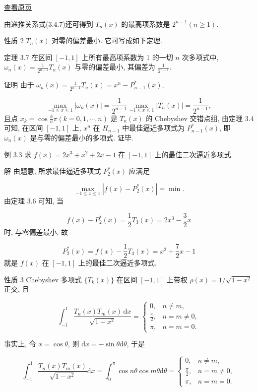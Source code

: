 \documentclass[
  10pt,
  fontset=fandol]{ctexart}
\begin{document}
\href{../../source-images/pdf-074.jpeg}{查看原页}

由递推关系式(3.4.7)还可得到 \(T_n(x)\) 的最高项系数是 \(2^{n-1}(n \geqslant 1)\).

性质 2 \(T_n(x)\) 对零的偏差最小. 它可写成如下定理.

定理 3.7 在区间 \([-1,1]\) 上所有最高项系数为 1 的一切 \(n\) 次多项式中, \(\omega_n(x) = \frac{1}{2^{n-1}} T_n(x)\) 与零的偏差最小, 其偏差为 \(\frac{1}{2^{n-1}}\).

证明 由于 \(\omega_n(x) = \frac{1}{2^{n-1}} T_n(x) = x^n - P_{n-1}^*(x)\),

\[
\max_{-1 \leqslant x \leqslant 1} |\omega_n(x)| = \frac{1}{2^{n-1}} \max_{-1 \leqslant x \leqslant 1} |T_n(x)| = \frac{1}{2^{n-1}} ,
\] 且点 \(x_k = \cos \frac{k}{n}\pi (k=0,1,\cdots,n)\) 是 \(T_n(x)\) 的 Chebyshev 交错点组, 由定理 3.4 可知, 在区间 \([-1,1]\) 上, \(x^n\) 在 \(H_{n-1}\) 中最佳逼近多项式为 \(P_{n-1}^*(x)\), 即 \(\omega_n(x)\) 是与零的偏差最小的多项式. 证毕.

例 3.3 求 \(f(x) = 2x^3 + x^2 + 2x - 1\) 在 \([-1,1]\) 上的最佳二次逼近多项式.

解 由题意, 所求最佳逼近多项式 \(P_{2}^*(x)\) 应满足

\[
\max_{-1 \leqslant x \leqslant 1} |f(x) - P_{2}^*(x)| = \min .
\] 由定理 3.6 可知, 当

\[
f(x) - P_{2}^*(x) = \frac{1}{2} T_3(x) = 2x^3 - \frac{3}{2}x
\] 时, 与零偏差最小, 故

\[
P_{2}^*(x) = f(x) - \frac{1}{2} T_3(x) = x^2 + \frac{7}{2}x - 1
\] 就是 \(f(x)\) 在 \([-1,1]\) 上的最佳二次逼近多项式.

性质 3 Chebyshev 多项式 \(\{T_k(x)\}\) 在区间 \([-1,1]\) 上带权 \(\rho(x) = 1 / \sqrt{1-x^2}\) 正交, 且

\[
\int_{-1}^{1} \frac{T_n(x)T_m(x)\,\mathrm{d}x}{\sqrt{1-x^2}} = \begin{cases} 0, & n \neq m, \\ \frac{\pi}{2}, & n = m \neq 0, \\ \pi, & n = m = 0. \end{cases} \tag{3.4.8}
\]

事实上, 令 \(x = \cos \theta\), 则 \(\mathrm{d}x = -\sin \theta \mathrm{d}\theta\), 于是

\[
\int_{-1}^{1} \frac{T_n(x)T_m(x)}{\sqrt{1-x^2}} \mathrm{d}x = \int_{0}^{\pi} \cos n\theta \cos m\theta \mathrm{d}\theta = \begin{cases} 0, & n \neq m, \\ \frac{\pi}{2}, & n = m \neq 0, \\ \pi, & n = m = 0. \end{cases}
\]
\end{document}
